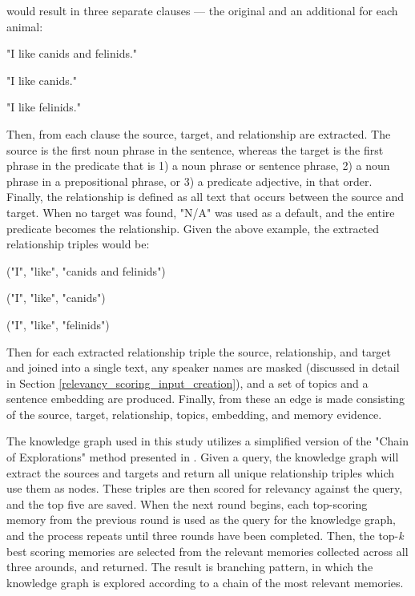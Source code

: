 \noindent would result in three separate clauses — the original and an additional for each animal:

\begin{displayquote}
"I like canids and felinids."

"I like canids."

"I like felinids."
\end{displayquote}

\noindent Then, from each clause the source, target, and relationship are extracted. The source is the first noun phrase in the sentence, whereas the target is the first phrase in the predicate that is 1) a noun phrase or sentence phrase, 2) a noun phrase in a prepositional phrase, or 3) a predicate adjective, in that order. Finally, the relationship is defined as all text that occurs between the source and target. When no target was found, "N/A" was used as a default, and the entire predicate becomes the relationship. Given the above example, the extracted relationship triples would be:

\begin{displayquote}
("I", "like", "canids and felinids")

("I", "like", "canids")

("I", "like", "felinids")
\end{displayquote}


\noindent Then for each extracted relationship triple the source, relationship, and target and joined into a single text, any speaker names are masked (discussed in detail in Section \ref{relevancy_scoring_input_creation}), and a set of topics and a sentence embedding are produced. Finally, from these an edge is made consisting of the source, target, relationship, topics, embedding, and memory evidence.

The knowledge graph used in this study utilizes a simplified version of the "Chain of Explorations" method presented in \cite{Sanmartin2024}. Given a query, the knowledge graph will extract the sources and targets and return all unique relationship triples which use them as nodes. These triples are then scored for relevancy against the query, and the top five are saved. When the next round begins, each top-scoring memory from the previous round is used as the query for the knowledge graph, and the process repeats until three rounds have been completed. Then, the top-\textit{k} best scoring memories are selected from the relevant memories collected across all three arounds, and returned. The result is branching pattern, in which the knowledge graph is explored according to a chain of the most relevant memories. 

